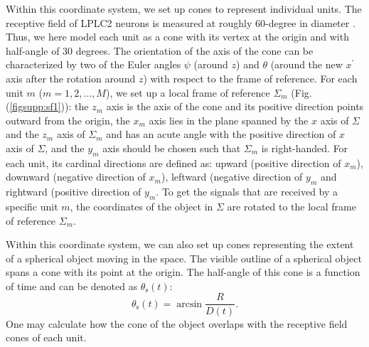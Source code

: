\documentclass[pdftex,9pt,lineno]{elife}
\begin{document}
Within this coordinate system, we set up cones to represent individual units. The receptive field of LPLC2 neurons is measured at roughly 60-degree in diameter \citep{klapoetke2017ultra}. Thus, we here model each unit as a cone with its vertex at the origin and with half-angle of 30 degrees. The orientation of the axis of the cone can be characterized by two of the Euler angles $\psi$ (around $z$) and $\theta$ (around the new $x^{'}$ axis after the rotation around $z$) with respect to the frame of reference. For each unit $m$ ($m=1, 2, \dots, M$), we set up a local frame of reference $\Sigma_{m}$ (Fig. (\ref{figsupp:sf1})): the $z_{m}$ axis is the axis of the cone and its positive direction points outward from the origin, the $x_{m}$ axis lies in the plane spanned by the $x$ axis of $\Sigma$ and the $z_{m}$ axis of $\Sigma_{m}$ and has an acute angle with the positive direction of $x$ axis of $\Sigma$, and the $y_{m}$ axis should be chosen such that $\Sigma_{m}$ is right-handed. For each unit, its cardinal directions are defined as: upward (positive direction of $x_{m}$), downward (negative direction of $x_{m}$), leftward (negative direction of $y_{m}$ and rightward (positive direction of $y_{m}$. To get the signals that are received by a specific unit $m$, the coordinates of the object in $\Sigma$ are rotated to the local frame of reference $\Sigma_{m}$.

Within this coordinate system, we can also set up cones representing the extent of a spherical object moving in the space. The visible outline of a spherical object spans a cone with its point at the origin. The half-angle of this cone is a function of time and can be denoted as $\theta_{\text{s}}(t)$:
\begin{equation}
\theta_{\text{s}}(t) = \arcsin{\frac{R}{D(t)}}.
\end{equation}
One may calculate how the cone of the object overlaps with the receptive field cones of each unit.
\end{document}
